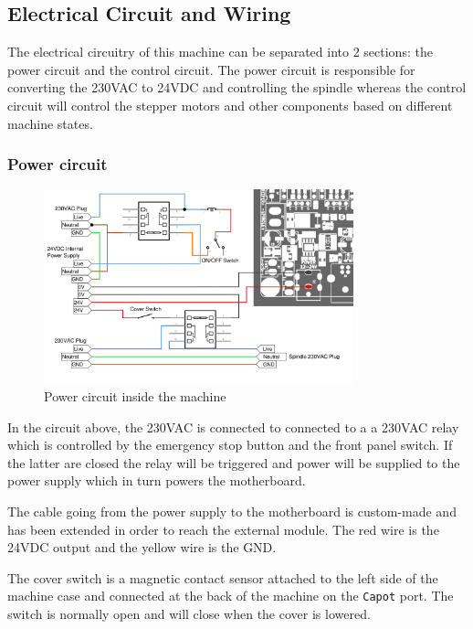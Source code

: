 \documentclass[11pt, openright]{book}
\begin{document}
     \subsection{Electrical Circuit and Wiring}

     The electrical circuitry of this machine can be separated into 2 sections: the power circuit and the control circuit. The power circuit is responsible for converting the 230VAC to 24VDC and controlling the spindle  whereas the control circuit will control the stepper motors and other components based on different machine states. 

      \subsubsection{Power circuit}

       \begin{figure}[ht!]
          \centering
          \includegraphics[width=0.8\textwidth]{./includes/schema_alim.png}
          \caption{Power circuit inside the machine }
      \end{figure}
    

      In the circuit above, the 230VAC is connected to connected to a a 230VAC relay which is controlled by the emergency stop button and the front panel switch. If the latter are closed the relay will be triggered and power will be supplied to the power supply which in turn powers the motherboard.
      
      The cable going from the power supply to the motherboard is custom-made and has been extended in order to reach the external module. The red wire is the 24VDC output and the yellow wire is the GND. 

      The cover switch is a magnetic contact sensor attached to the left side of the machine case and connected at the back of the machine on the \texttt{Capot} port. The switch is normally open and will close when the cover is lowered. 
      
\end{document}

